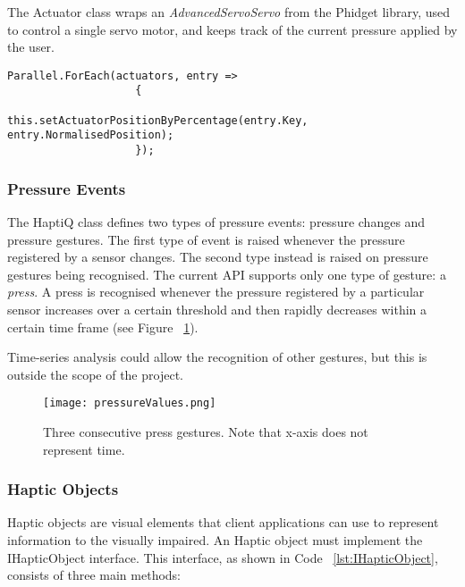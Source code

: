 The Actuator class wraps an \textit{AdvancedServoServo} from the Phidget library, used to control a single servo motor, and keeps track of the current pressure applied by the user. 

\lstset{style=sharpc1}
\begin{lstlisting}[caption={Parallelising Actuators},label={lst:parallelActuators}]
Parallel.ForEach(actuators, entry => 
                    {
                        this.setActuatorPositionByPercentage(entry.Key, entry.NormalisedPosition);
                    });
\end{lstlisting}

\subsubsection{Pressure Events}

The HaptiQ class defines two types of pressure events: pressure changes and pressure gestures. The first type of event is raised whenever the pressure registered by a sensor changes. The second type instead is raised on pressure gestures being recognised. The current API supports only one type of gesture: a \textit{press}. A press is recognised whenever the pressure registered by a particular sensor increases over a certain threshold and then rapidly decreases within a certain time frame (see Figure ~\ref{fig:pressureValues}). 

Time-series analysis could allow the recognition of other gestures, but this is outside the scope of the project.


\begin{figure}[H]
  \centering
  \texttt{[image: pressureValues.png]}
  \caption{Three consecutive press gestures. Note that x-axis does not represent time.}
  \label{fig:pressureValues}
\end{figure}

\subsubsection{Haptic Objects}

Haptic objects are visual elements that client applications can use to represent information to the visually impaired. An Haptic object must implement the IHapticObject interface. This interface, as shown in Code ~\ref{lst:IHapticObject}, consists of three main methods:

